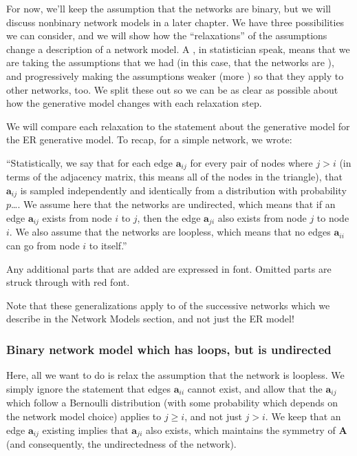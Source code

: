 \documentclass[letterpaper,10pt,english]{jupyterBook}
\begin{document}
\sphinxAtStartPar
For now, we’ll keep the assumption that the networks are binary, but we will discuss non\sphinxhyphen{}binary network models in a later chapter. We have three possibilities we can consider, and we will show how the “relaxations” of the assumptions change a description of a network model. A , in statistician speak, means that we are taking the assumptions that we had (in this case, that the networks are ), and progressively making the assumptions weaker (more ) so that they apply to other networks, too. We split these out so we can be as clear as possible about how the generative model changes with each relaxation step.

\sphinxAtStartPar
We will compare each relaxation to the statement about the generative model for the ER generative model. To recap, for a simple network, we wrote:

\sphinxAtStartPar
“Statistically, we say that for each edge \(\mathbf{a}_{ij}\) for every pair of nodes where \(j > i\) (in terms of the adjacency matrix, this means all of the nodes in the  triangle), that \(\mathbf{a}_{ij}\) is sampled independently and identically from a  distribution with probability \(p\)….  We assume here that the networks are undirected, which means that if an edge \(\mathbf a_{ij}\) exists from node \(i\) to \(j\), then the edge \(\mathbf a_{ji}\) also exists from node \(j\) to node \(i\). We also assume that the networks are loopless, which means that no edges \(\mathbf a_{ii}\) can go from node \(i\) to itself.”

\sphinxAtStartPar
Any additional parts that are added are expressed in  font. Omitted parts are struck through with red font.

\sphinxAtStartPar
Note that these generalizations apply to  of the successive networks which we describe in the Network Models section, and not just the ER model!


\subsubsection{Binary network model which has loops, but is undirected}
\label{\detokenize{representations/ch5/single-network-models_theory:binary-network-model-which-has-loops-but-is-undirected}}
\sphinxAtStartPar
Here, all we want to do is relax the assumption that the network is loopless. We simply ignore the statement that edges \(\mathbf a_{ii}\) cannot exist, and allow that the \(\mathbf a_{ij}\) which follow a Bernoulli distribution (with some probability which depends on the network model choice)  applies to \(j \geq i\), and not just \(j > i\). We keep that an edge \(\mathbf a_{ij}\) existing implies that \(\mathbf a_{ji}\) also exists, which maintains the symmetry of \(\mathbf A\) (and consequently, the undirectedness of the network).
\end{document}
